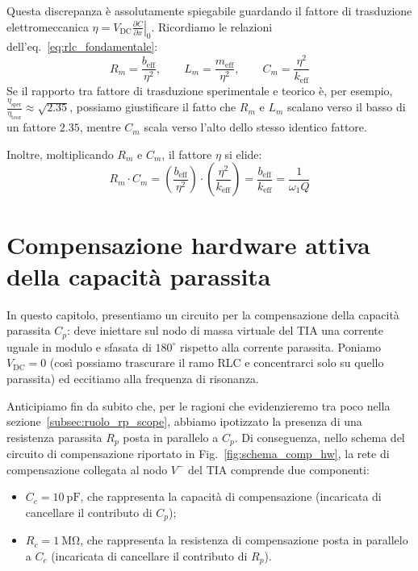 \documentclass[11pt,a4paper]{article}
\begin{document}
\noindent Questa discrepanza è assolutamente spiegabile guardando il fattore di trasduzione elettromeccanica $\eta = V_{\text{DC}} \left.\frac{\partial C}{\partial x}\right|_0$. Ricordiamo le relazioni dell'eq.~\eqref{eq:rlc_fondamentale}:
    \begin{equation}
        R_m = \frac{b_{\text{eff}}}{\eta^2}, \qquad L_m = \frac{m_{\text{eff}}}{\eta^2}, \qquad C_m = \frac{\eta^2}{k_{\text{eff}}}
    \end{equation}
Se il rapporto tra fattore di trasduzione sperimentale e teorico è, per esempio, $\frac{\eta_{\text{sper}}}{\eta_{\text{teor}}} \approx \sqrt{2.35}$, possiamo giustificare il fatto che $R_m$ e $L_m$ scalano verso il basso di un fattore $2.35$, mentre $C_m$ scala verso l'alto dello stesso identico fattore.

\noindent Inoltre, moltiplicando $R_m$ e $C_m$, il fattore $\eta$ si elide:
    \begin{equation}
        R_m \cdot C_m = \left( \frac{b_{\text{eff}}}{\eta^2} \right) \cdot \left( \frac{\eta^2}{k_{\text{eff}}} \right) = \frac{b_{\text{eff}}}{k_{\text{eff}}} = \frac{1}{\omega_1 Q}
    \end{equation}


\newpage
\section{Compensazione hardware attiva della capacità parassita}
\label{sec:compensazione_hardware}

In questo capitolo, presentiamo un circuito per la compensazione della capacità parassita $C_p$: deve iniettare sul nodo di massa virtuale del TIA una corrente uguale in modulo e sfasata di $180^\circ$ rispetto alla corrente parassita. Poniamo $V_{\text{DC}}=0$ (così possiamo trascurare il ramo RLC e concentrarci solo su quello parassita) ed eccitiamo alla frequenza di risonanza.

\noindent Anticipiamo fin da subito che, per le ragioni che evidenzieremo tra poco nella sezione~\ref{subsec:ruolo_rp_scope}, abbiamo ipotizzato la presenza di una resistenza parassita $R_p$ posta in parallelo a $C_p$. Di conseguenza, nello schema del circuito di compensazione riportato in Fig.~\ref{fig:schema_comp_hw}, la rete di compensazione collegata al nodo $V^-$ del TIA comprende due componenti:
\begin{itemize}
    \item $C_c = \SI{10}{\pico\farad}$, che rappresenta la capacità di compensazione (incaricata di cancellare il contributo di $C_p$);
    \item $R_c = \SI{1}{\mega\ohm}$, che rappresenta la resistenza di compensazione posta in parallelo a $C_c$ (incaricata di cancellare il contributo di $R_p$).
\end{itemize}
\end{document}
